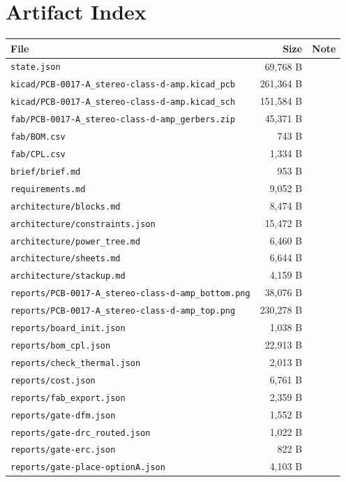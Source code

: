 \documentclass[11pt,a4paper]{article}
\begin{document}
\section{Artifact Index}
{\small
\begin{longtable}{p{9cm}rp{4cm}}
\toprule
\textbf{File} & \textbf{Size} & \textbf{Note} \\
\midrule
\endhead
\texttt{state.json} & 69,768 B &  \\
\texttt{kicad/PCB-0017-A\_stereo-class-d-amp.kicad\_pcb} & 261,364 B &  \\
\texttt{kicad/PCB-0017-A\_stereo-class-d-amp.kicad\_sch} & 151,584 B &  \\
\texttt{fab/PCB-0017-A\_stereo-class-d-amp\_gerbers.zip} & 45,371 B &  \\
\texttt{fab/BOM.csv} & 743 B &  \\
\texttt{fab/CPL.csv} & 1,334 B &  \\
\texttt{brief/brief.md} & 953 B &  \\
\texttt{requirements.md} & 9,052 B &  \\
\texttt{architecture/blocks.md} & 8,474 B &  \\
\texttt{architecture/constraints.json} & 15,472 B &  \\
\texttt{architecture/power\_tree.md} & 6,460 B &  \\
\texttt{architecture/sheets.md} & 6,644 B &  \\
\texttt{architecture/stackup.md} & 4,159 B &  \\
\texttt{reports/PCB-0017-A\_stereo-class-d-amp\_bottom.png} & 38,076 B &  \\
\texttt{reports/PCB-0017-A\_stereo-class-d-amp\_top.png} & 230,278 B &  \\
\texttt{reports/board\_init.json} & 1,038 B &  \\
\texttt{reports/bom\_cpl.json} & 22,913 B &  \\
\texttt{reports/check\_thermal.json} & 2,013 B &  \\
\texttt{reports/cost.json} & 6,761 B &  \\
\texttt{reports/fab\_export.json} & 2,359 B &  \\
\texttt{reports/gate-dfm.json} & 1,552 B &  \\
\texttt{reports/gate-drc\_routed.json} & 1,022 B &  \\
\texttt{reports/gate-erc.json} & 822 B &  \\
\texttt{reports/gate-place-optionA.json} & 4,103 B &  \\

\end{longtable}}
\end{document}

